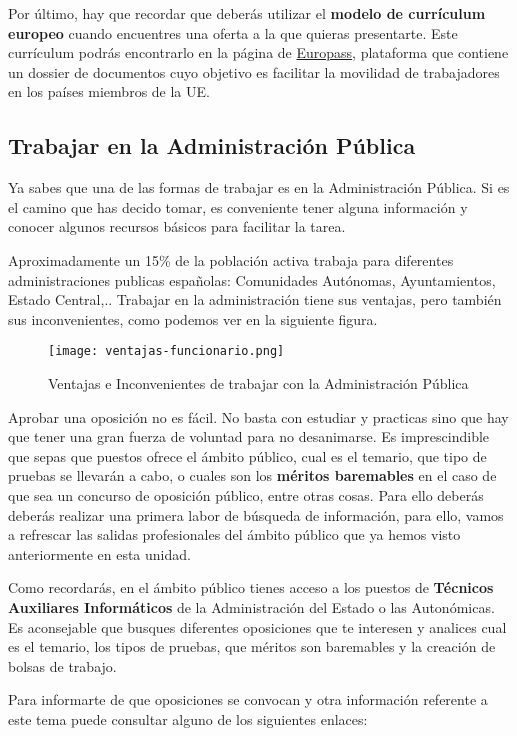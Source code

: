 Por último, hay que recordar que deberás utilizar el \textbf{modelo de currículum europeo} cuando encuentres una oferta a la que quieras presentarte. Este currículum podrás encontrarlo en la página de \href{https://europa.eu/europass/es/create-europass-cv}{Europass}, plataforma que contiene un dossier de documentos cuyo objetivo es facilitar la movilidad de trabajadores en los países miembros de la UE.

\subsection{Trabajar en la Administración Pública}
Ya sabes que una de las formas de trabajar es en la Administración Pública. Si es el camino que has decido tomar, es conveniente tener alguna información y conocer algunos recursos básicos para facilitar la tarea.

Aproximadamente un 15\% de la población activa trabaja para diferentes administraciones publicas españolas: Comunidades Autónomas, Ayuntamientos, Estado Central,.. Trabajar en la administración tiene sus ventajas, pero también sus inconvenientes, como podemos ver en la siguiente figura.

\begin{figure}[ht]
    \centering
    \texttt{[image: ventajas-funcionario.png]}
    \caption{Ventajas e Inconvenientes de trabajar con la Administración Pública}
\end{figure}

Aprobar una oposición no es fácil. No basta con estudiar y practicas sino que hay que tener una gran fuerza de voluntad para no desanimarse. Es imprescindible que sepas que puestos ofrece el ámbito público, cual es el temario, que tipo de pruebas se llevarán a cabo, o cuales son los \textbf{méritos baremables} en el caso de que sea un concurso de oposición público, entre otras cosas. Para ello deberás deberás realizar una primera labor de búsqueda de información, para ello, vamos a refrescar las salidas profesionales del ámbito público que ya hemos visto anteriormente en esta unidad.

Como recordarás, en el ámbito público tienes acceso a los puestos de \textbf{Técnicos Auxiliares Informáticos} de la Administración del Estado o las Autonómicas. Es aconsejable que busques diferentes oposiciones que te interesen y analices cual es el temario, los tipos de pruebas, que méritos son baremables y la creación de bolsas de trabajo.

Para informarte de que oposiciones se convocan y otra información referente a este tema puede consultar alguno de los siguientes enlaces:

